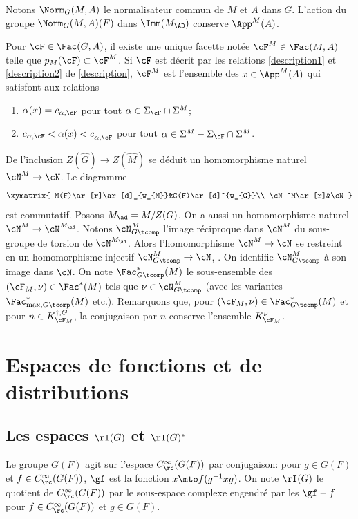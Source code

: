 Notons $\Norm_{G}(M,A)$ le normalisateur commun de $M$ et $A$ dans $G$. L'action du groupe $\Norm_{G}(M,A)(F)$ dans $\Imm(M_{\AD})$ conserve $\App^M(A)$.

Pour $\cF\in \Fac(G,A)$, il existe une unique facette notée $\cF^{M}\in \Fac(M,A)$ telle que $p_{M}(\cF)\subset \cF^{M}$. Si $\cF$ est décrit par les relations \eqref{description1} et \eqref{description2} de \ref{description}, $\cF^{M}$ est l'ensemble des $x\in \App^M(A)$ qui satisfont aux relations
\begin{enumerate}
\item\label{groupesdelevi1}
$\alpha(x)=c_{\alpha,\cF}$ pour tout $\alpha\in \Sigma_{\cF}\cap \Sigma^M$;

\item\label{groupesdelevi2}
$c_{\alpha,\cF}<\alpha(x)<c_{\alpha,\cF}^+$ pour tout $\alpha\in \Sigma^M-\Sigma_{\cF}\cap \Sigma^M$.
\end{enumerate}

De l'inclusion $Z(\hat{G})\to Z(\hat{M})$ se déduit un homomorphisme naturel $\cN^M\to \cN$. Le diagramme
\[
\xymatrix{
M(F)\ar[r]\ar[d]_{w_{M}}&G(F)\ar[d]^{w_{G}}\\
\cN^M\ar[r]&\cN
}
\]
est commutatif. Posons $M_{\ad}=M/Z(G)$. On a aussi un homomorphisme naturel $\cN^M\to \cN^{M_{\ad}}$. Notons $\cN_{G\tcomp}^M$ l'image réciproque dans $\cN^M$ du sous-groupe de torsion de $\cN^{M_{\ad}}$. Alors l'homomorphisme $\cN^M\to \cN$ se restreint en un homomorphisme injectif $\cN^M_{G\tcomp}\to \cN$, \cf \cite[6(1)]{W2}. On identifie $\cN^M_{G\tcomp}$ à son image dans $\cN$. On note $\Fac^*_{G\tcomp}(M)$ le sous-ensemble des $(\cF_{M},\nu)\in \Fac^*(M)$ tels que $\nu\in \cN^M_{G\tcomp}$ (avec les variantes $\Fac^*_{\max,G\tcomp}(M)$ etc.). Remarquons que, pour $(\cF_{M},\nu)\in \Fac^*_{G\tcomp}(M)$ et pour $n\in K_{\cF_{M}}^{\dag,G}$, la conjugaison par $n$ conserve l'ensemble $K_{\cF_{M}}^{\nu}$.

\section{Espaces de fonctions et de distributions}

\subsection{Les espaces \texorpdfstring{$\rI(G)$ et $\rI(G)^*$}{GetG}}\label{lesespaces}

Le groupe $G(F)$ agit sur l'espace $C_{\rc}^{\infty}(G(F))$ par conjugaison: pour $g\in G(F)$ et $f\in C_{\rc}^{\infty}(G(F))$, $\gf$ est la fonction $x\mto f(g^{-1}xg)$. On note $\rI(G)$ le quotient de $C_{\rc}^{\infty}( G(F))$ par le sous-espace complexe engendré par les $\gf-f$ pour $f\in C_{\rc}^{\infty}(G(F))$ et $g\in G(F)$.

